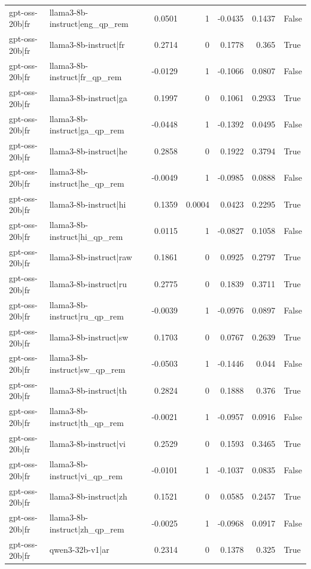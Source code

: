 \begin{table}
\begin{tabular}{l l r r r r l}
gpt-oss-20b|fr & llama3-8b-instruct|eng_qp_rem & 0.0501 & 1 & -0.0435 & 0.1437 & False \\
gpt-oss-20b|fr & llama3-8b-instruct|fr & 0.2714 & 0 & 0.1778 & 0.365 & True \\
gpt-oss-20b|fr & llama3-8b-instruct|fr_qp_rem & -0.0129 & 1 & -0.1066 & 0.0807 & False \\
gpt-oss-20b|fr & llama3-8b-instruct|ga & 0.1997 & 0 & 0.1061 & 0.2933 & True \\
gpt-oss-20b|fr & llama3-8b-instruct|ga_qp_rem & -0.0448 & 1 & -0.1392 & 0.0495 & False \\
gpt-oss-20b|fr & llama3-8b-instruct|he & 0.2858 & 0 & 0.1922 & 0.3794 & True \\
gpt-oss-20b|fr & llama3-8b-instruct|he_qp_rem & -0.0049 & 1 & -0.0985 & 0.0888 & False \\
gpt-oss-20b|fr & llama3-8b-instruct|hi & 0.1359 & 0.0004 & 0.0423 & 0.2295 & True \\
gpt-oss-20b|fr & llama3-8b-instruct|hi_qp_rem & 0.0115 & 1 & -0.0827 & 0.1058 & False \\
gpt-oss-20b|fr & llama3-8b-instruct|raw & 0.1861 & 0 & 0.0925 & 0.2797 & True \\
gpt-oss-20b|fr & llama3-8b-instruct|ru & 0.2775 & 0 & 0.1839 & 0.3711 & True \\
gpt-oss-20b|fr & llama3-8b-instruct|ru_qp_rem & -0.0039 & 1 & -0.0976 & 0.0897 & False \\
gpt-oss-20b|fr & llama3-8b-instruct|sw & 0.1703 & 0 & 0.0767 & 0.2639 & True \\
gpt-oss-20b|fr & llama3-8b-instruct|sw_qp_rem & -0.0503 & 1 & -0.1446 & 0.044 & False \\
gpt-oss-20b|fr & llama3-8b-instruct|th & 0.2824 & 0 & 0.1888 & 0.376 & True \\
gpt-oss-20b|fr & llama3-8b-instruct|th_qp_rem & -0.0021 & 1 & -0.0957 & 0.0916 & False \\
gpt-oss-20b|fr & llama3-8b-instruct|vi & 0.2529 & 0 & 0.1593 & 0.3465 & True \\
gpt-oss-20b|fr & llama3-8b-instruct|vi_qp_rem & -0.0101 & 1 & -0.1037 & 0.0835 & False \\
gpt-oss-20b|fr & llama3-8b-instruct|zh & 0.1521 & 0 & 0.0585 & 0.2457 & True \\
gpt-oss-20b|fr & llama3-8b-instruct|zh_qp_rem & -0.0025 & 1 & -0.0968 & 0.0917 & False \\
gpt-oss-20b|fr & qwen3-32b-v1|ar & 0.2314 & 0 & 0.1378 & 0.325 & True \\

\end{tabular}
\end{table}
